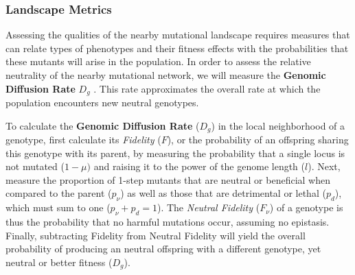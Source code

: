 \documentclass[letterpaper]{article}
\begin{document}
\subsubsection{Landscape Metrics} 
Assessing the qualities of the nearby mutational landscape requires measures that can relate types of phenotypes and their fitness effects with the probabilities that these mutants will arise in the population. In order to assess the relative neutrality of the nearby mutational network, we will measure the \textbf{Genomic Diffusion Rate} $D_g$ \cite{ofria_evolution_2002}. This rate approximates the overall rate at which the population encounters new neutral genotypes.
% 
% 

% 
% 

To calculate the \textbf{Genomic Diffusion Rate} ($D_g$) in the local neighborhood of a genotype, first calculate its \textit{Fidelity} ($F$), or the probability of an offspring sharing this genotype with its parent, by measuring the probability that a single locus is not mutated ($1-\mu)$ and raising it to the power of the genome length ($l$). Next, measure the proportion of 1-step mutants that are neutral or beneficial when compared to the parent ($p_\nu$) as well as those that are detrimental or lethal ($p_d$), which must sum to one ($p_\nu + p_d = 1$).  The \textit{Neutral Fidelity} ($F_\nu$) of a genotype is thus the probability that no harmful mutations occur, assuming no epistasis. Finally, subtracting Fidelity from Neutral Fidelity will yield the overall probability of producing an neutral offspring with a different genotype, yet neutral or better fitness ($D_g$). 
\end{document}
